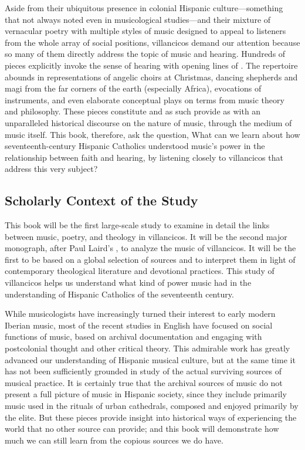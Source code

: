 \documentclass[tt]{vcbook-proposal}
\begin{document}
Aside from their ubiquitous presence in colonial Hispanic culture---something that not always noted even in musicological studies---and their mixture of vernacular poetry with multiple styles of music designed to appeal to listeners from the whole array of social positions, villancicos demand our attention because so many of them directly address the topic of music and hearing.
Hundreds of pieces explicitly invoke the sense of hearing with opening lines of   .
The repertoire abounds in representations of angelic choirs at Christmas, dancing shepherds and magi from the far corners of the earth (especially Africa), evocations of instruments, and even elaborate conceptual plays on terms from music theory and philosophy.
These pieces constitute  and as such provide as with an unparalleled historical discourse on the nature of music, through the medium of music itself.
This book, therefore, ask the question,
What can we learn about how seventeenth-century Hispanic Catholics understood music's power in the relationship between faith and hearing, by listening closely to villancicos that address this very subject?

\subsection{Scholarly Context of the Study}

This book will be the first large-scale study to examine in detail the links between music, poetry, and theology in villancicos.
It will be the second major monograph, after Paul Laird's , to analyze the music of villancicos.
It will be the first to be based on a global selection of sources and to interpret them in light of contemporary theological literature and devotional practices.
This study of villancicos helps us understand what kind of power music had in the understanding of Hispanic Catholics of the seventeenth century.

While musicologists have increasingly turned their interest to early modern Iberian music, most of the recent studies in English have focused on social functions of music, based on archival documentation and engaging with postcolonial thought and other critical theory.
This admirable work has greatly advanced our understanding of Hispanic musical culture, but at the same time it has not been sufficiently grounded in study of the actual surviving sources of musical practice.
It is certainly true that the archival sources of music do not present a full picture of music in Hispanic society, since they include primarily music used in the rituals of urban cathedrals, composed and enjoyed primarily by the elite.
But these pieces provide insight into historical ways of experiencing the world that no other source can provide; and this book will demonstrate how much we can still learn from the copious sources we do have.
\end{document}
